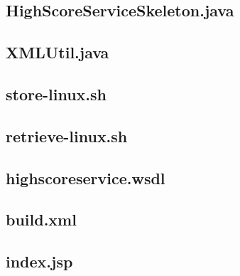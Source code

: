 \documentclass[a4paper, 12pt]{article}
\begin{document}
\newpage
\subsection{HighScoreServiceSkeleton.java}\label{HighScoreServiceSkeleton.java}
\begin{footnotesize}
  
\end{footnotesize}

\newpage
\subsection{XMLUtil.java}\label{XMLUtil.java}
\begin{footnotesize}
  
\end{footnotesize}

\newpage
\subsection{store-linux.sh}\label{store-linux.sh}
\begin{footnotesize}
  
\end{footnotesize}

\newpage
\subsection{retrieve-linux.sh}\label{etrieve-linux.sh}
\begin{footnotesize}
  
\end{footnotesize}

\newpage
\subsection{highscoreservice.wsdl}\label{highscoreservice.wsdl}
\begin{footnotesize}
  
\end{footnotesize}

\newpage
\subsection{build.xml}\label{build.xml}
\begin{footnotesize}
  
\end{footnotesize}

\newpage
\subsection{index.jsp}\label{index.jsp}
\begin{footnotesize}
  
\end{footnotesize}
\end{document}
